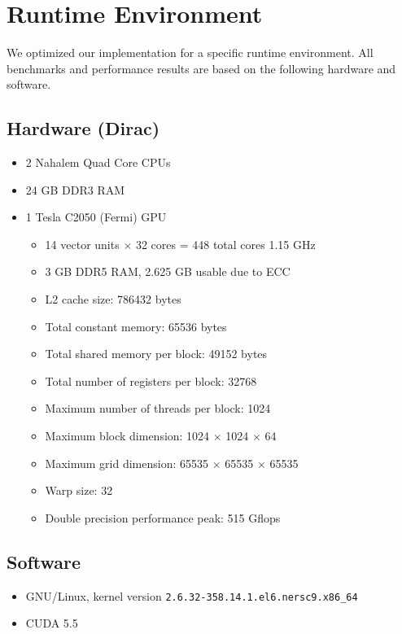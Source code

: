 \documentclass[12pt]{article}
\begin{document}
\section{Runtime Environment}
We optimized our implementation for a specific runtime environment. All benchmarks and performance results are based on the following hardware and software.

\subsection{Hardware (Dirac)}
\begin{itemize}
        \item 2 Nahalem Quad Core CPUs
        \item 24 GB DDR3 RAM
        \item 1 Tesla C2050 (Fermi) GPU
        \begin{itemize}
                \item 14 vector units $\times$ 32 cores = 448 total cores \@ 1.15 GHz
                \item 3 GB DDR5 RAM, 2.625 GB usable due to ECC
                \item L2 cache size: 786432 bytes
                \item Total constant memory: 65536 bytes
                \item Total shared memory per block: 49152 bytes
                \item Total number of registers per block: 32768
                \item Maximum number of threads per block: 1024
                \item Maximum block dimension: 1024 $\times$ 1024 $\times$ 64
                \item Maximum grid dimension: 65535 $\times$ 65535 $\times$ 65535
                \item Warp size: 32
                \item Double precision performance peak: 515 Gflops
        \end{itemize}
        \end{itemize}

\subsection{Software}
\begin{itemize}
	\item GNU/Linux, kernel version \texttt{2.6.32-358.14.1.el6.nersc9.x86\_64}
    \item CUDA 5.5
\end{itemize}
\end{document}
